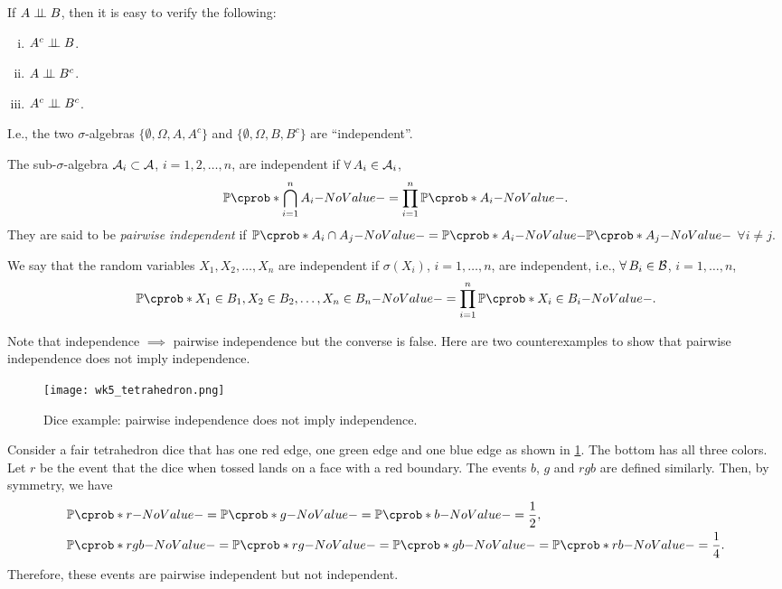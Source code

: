 \documentclass[12pt]{article}
\begin{document}
If $A \independent B$, then it is easy to verify the following:
\begin{enumerate}[(i)]
\item $A^c \independent B$.
\item $A \independent B^c$.
\item $A^c \independent B^c$.
\end{enumerate}
I.e., the two $\sigma$-algebras $\{\emptyset,\Omega ,A, A^c\}$ and $\{\emptyset,\Omega ,B, B^c\}$ are ``independent''.

\begin{Definition}
The sub-$\sigma$-algebra $\mathcal{A}_i \subset \mathcal{A}$, $i=1,2,\ldots, n$, are independent if $\forall A_i \in \calA_i$, 
\begin{align*}
\P(\bigcap_{i=1}^n {A_i})= \prod_{i=1}^n {\P(A_i)}.
\end{align*}
They are said to be \emph{pairwise independent} if $\P(A_i \cap A_j)=\P(A_i)\P(A_j)$ $\forall i \neq j$.
\end{Definition}

We say that the random variables $X_1,X_2,\ldots,X_n$ are independent if $\sigma(X_i)$, $i=1,\ldots,n$, are independent, i.e., $\forall B_i \in \calB$, $i=1,\ldots,n$,
\begin{align*}
\P (X_1\in B_1,X_2\in B_2,\ldots,X_n\in B_n)= \prod_{i=1}^n {\P(X_i \in B_i)}.
\end{align*}

Note that independence $\implies$ pairwise independence but the converse is false. Here are two counterexamples to show that pairwise independence does not imply independence.

\begin{Example}\label{wk5:Independence1}
\begin{figure}[!htb]
\centering
\texttt{[image: wk5\_tetrahedron.png]} 
\caption{Dice example: pairwise independence does not imply independence.} 
\label{wk5:fg:Independence}
\end{figure}
Consider a fair tetrahedron dice that has one red edge, one green edge and one blue edge as shown in \cref{wk5:fg:Independence}. The bottom has all three colors. Let $r$ be the event that the dice when tossed lands on a face with a red boundary. The events $b$, $g$ and $rgb$ are defined similarly. Then, by symmetry, we have
\begin{align*}
&\P (r)=\P(g)=\P(b)=\frac{1}{2}, \\
&\P (rgb)=\P(rg)=\P(gb)=\P(rb)=\frac{1}{4}.
\end{align*}
Therefore, these events are pairwise independent but not independent.
\end{Example}
\end{document}

